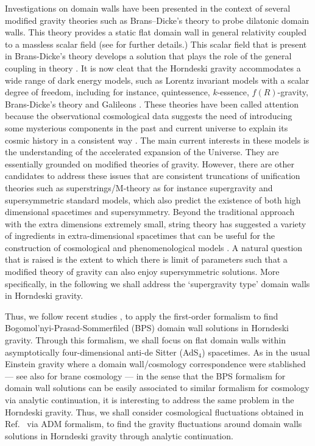 \documentclass[aps,12pt, a4paper,nofootinbib]{revtex4}
\begin{document}
{ Investigations on domain walls have been presented in the context of several modified gravity theories such as Brans–Dicke's theory to probe dilatonic domain walls. This theory provides a static flat domain wall in general relativity coupled to a massless scalar field (see \cite{Groen:1992sm} for further details.) This scalar field that is present in Brans-Dicke's theory develops a solution that plays the role of  the general coupling in theory \cite{La:1992fs}. It is now cleat  that the Horndeski gravity accommodates a wide range of dark energy models, such as Lorentz invariant models with a scalar degree of freedom, including for instance, quintessence, $k$-essence, $f(R)$-gravity, Brans-Dicke's theory and Galileons \cite{Charmousis:2011bf,Charmousis:2011ea,Babichev:2017lmw,Starobinsky:2016kua,Bruneton:2012zk,Brito:2018pwe,Brito:2019ose}. These theories have been called attention because the observational cosmological data suggests the need of introducing some mysterious components in the past and current universe to explain its cosmic history in a consistent way \cite{Santos:2019ljs}. The main current interests in these models is the understanding of the accelerated expansion of the Universe. They are essentially grounded on modified theories of gravity. However, there are other candidates to address these issues that are consistent truncations of unification theories such as superstrings/M-theory as for instance supergravity and supersymmetric standard models, which also predict the existence of both high dimensional spacetimes and supersymmetry. Beyond the traditional approach with the extra dimensions extremely small, string theory has suggested a variety of ingredients in extra-dimensional spacetimes that can be useful for the construction of cosmological and phenomenological models \cite{ArkaniHamed:1998rs,Antoniadis:1998ig,Randall:1999ee,Randall:1999vf,Kaloper:1999sm,Nihei:1999mt}. A natural question that is raised is the extent to which there is limit of parameters such that a modified theory of gravity can also enjoy supersymmetric solutions. More specifically, in the following  we shall address the `supergravity type' domain walls in Horndeski gravity.  

Thus, we follow recent studies \cite{Brito:2018pwe,Santos:2019ljs}, to apply the first-order formalism to find Bogomol'nyi-Prasad-Sommerfiled (BPS) domain wall solutions in Horndeski gravity. Through this formalism, we shall focus on flat domain walls within asymptotically four-dimensional anti-de Sitter (AdS$_{4}$) spacetimes. As in the usual Einstein gravity where a domain wall/cosmology correspondence were stablished \cite{Skenderis:2006jq} --- see also \cite{Bazeia:2007vx} for brane cosmology --- in the sense that the BPS formalism for domain wall solutions can be easily associated to similar formalism for cosmology via analytic continuation, it is interesting to address the same problem in the Horndeski gravity. Thus, we shall consider cosmological fluctuations obtained in Ref.~\cite{Kob} via ADM formalism, to find the gravity fluctuations around domain walls solutions in Horndeski gravity through analytic continuation.

}
\end{document}
